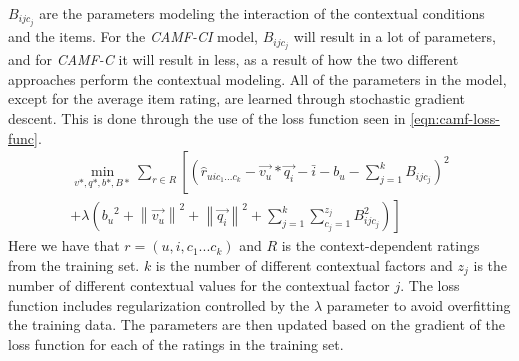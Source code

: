 $B_{ijc_j}$ are the parameters modeling the interaction of the contextual conditions and the items.
For the \textit{CAMF-CI} model, $B_{ijc_j}$ will result in a lot of parameters, and for \textit{CAMF-C} it will result in less, as a result of how the two different approaches perform the contextual modeling.
All of the parameters in the model, except for the average item rating, are learned through stochastic gradient descent.
This is done through the use of the loss function seen in \autoref{eqn:camf-loss-func}.
\begin{equation}
    \label{eqn:camf-loss-func}
    \begin{split}
        \min_{v*, q*, b*, B*}\sum \limits_{r \in  R}\left [ \left (  \hat{r}_{uic_1...c_k} - \vec{v_u} * \vec{q_i} - \bar{i} - b_u - \sum\limits_{j = 1}^k B_{ijc_j}\right )^2 \right. \\
        \left. + \lambda \left({b_u}^2 +{\left \| \vec{v_u} \right \|}^2  + {\left \|\vec{q_i}  \right \|}^2 + \sum\limits_{j = 1}^k \sum\limits_{c_j = 1}^{z_j} B_{ijc_j}^{2}\right ) \right ]
    \end{split}
\end{equation}
Here we have that $r = (u,i,c_1...c_k)$ and $R$ is the context-dependent ratings from the training set.
$k$ is the number of different contextual factors and $z_j$ is the number of different contextual values for the contextual factor $j$.
The loss function includes regularization controlled by the $\lambda$ parameter to avoid overfitting the training data.
The parameters are then updated based on the gradient of the loss function for each of the ratings in the training set.
